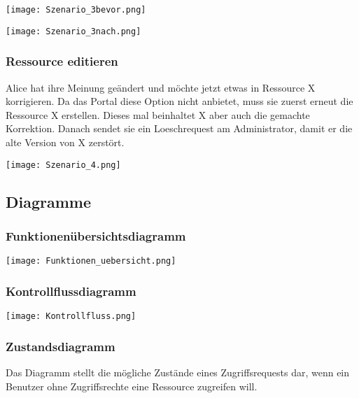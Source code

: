 \documentclass[parskip=full,11pt]{scrartcl}
\begin{document}
	\begin{center}
	\texttt{[image: Szenario\_3bevor.png]}
	
	\texttt{[image: Szenario\_3nach.png]}
	\end{center}

\subsubsection*{Ressource editieren}
Alice hat ihre Meinung geändert und möchte jetzt etwas in Ressource X korrigieren. Da das Portal diese Option nicht anbietet, muss sie zuerst erneut die Ressource X erstellen. Dieses mal beinhaltet X aber auch die gemachte Korrektion. Danach sendet sie ein Loeschrequest am Administrator, damit er die alte Version von X zerstört.\\
	
	\begin{center}
	\texttt{[image: Szenario\_4.png]}
	\end{center}
	
\subsection{Diagramme}

\subsubsection*{Funktionenübersichtsdiagramm}

	\begin{center}
	\texttt{[image: Funktionen\_uebersicht.png]}
	\end{center}
	
\subsubsection*{Kontrollflussdiagramm \grqq}

	\begin{center}
	\texttt{[image: Kontrollfluss.png]}
	\end{center}
	
\subsubsection*{Zustandsdiagramm \grqq}
Das Diagramm stellt die mögliche Zustände eines Zugriffsrequests dar, wenn ein Benutzer ohne Zugriffsrechte eine Ressource zugreifen will.
\\
\end{document}
